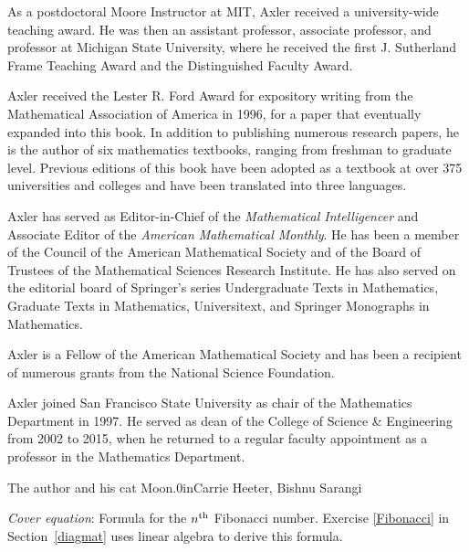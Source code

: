 As a postdoctoral Moore Instructor at MIT, Axler received a university-wide teaching award. He was then an assistant professor, associate professor, and professor at Michigan State University, where he received the first J. Sutherland Frame Teaching Award and the Distinguished Faculty Award.

Axler received the Lester R. Ford Award for expository writing from the Mathematical Association of America in 1996, for a paper that eventually expanded into this book. In addition to publishing numerous research papers, he is the author of six mathematics textbooks, ranging from freshman to graduate level. Previous editions of this book have been adopted as a textbook at over 375 universities and colleges and have been translated into three languages.

Axler has served as Editor-in-Chief of the \textit{Mathematical Intelligencer} and Associate Editor of the \textit{American Mathematical Monthly}. He has been a member of the Council of the American Mathematical Society and of the Board of Trustees of the Mathematical Sciences Research Institute. He has also served on the editorial board of Springer's series Undergraduate Texts in Mathematics, Graduate Texts in Mathematics, Universitext, and Springer Monographs in Mathematics.

Axler is a Fellow of the American Mathematical Society and has been a recipient of numerous grants from the National Science Foundation.

Axler joined San Francisco State University as chair of the Mathematics Department in 1997. He served as dean of the College of Science \& Engineering from 2002 to 2015, when he returned to a regular faculty appointment as a professor in the Mathematics Department.

\smallskip


%
{The author and his cat Moon.}{0in}{Carrie Heeter, Bishnu Sarangi} \label{0moon}

\medskip

\noindent
\textit{Cover equation}: Formula for the $n^{\text{{th}}}$ Fibonacci number. Exercise \ref{Fibonacci} in Section~\ref{diagmat} uses linear algebra to derive this formula.



